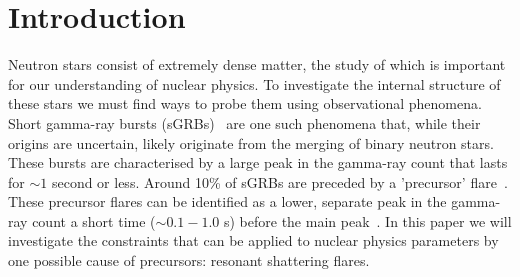 \documentclass[fleqn,usenatbib]{mnras}
\begin{document}



 


\section{Introduction}
\hspace{\parindent}Neutron stars consist of extremely dense matter, the study of which is important for our understanding of nuclear physics. To investigate the internal structure of these stars we must find ways to probe them using observational phenomena. Short gamma-ray bursts (sGRBs)~\cite{d2015short} are one such phenomena that, while their origins are uncertain, likely originate from the merging of binary neutron stars. These bursts are characterised by a large peak in the gamma-ray count that lasts for $\sim 1$ second or less. Around 10\% of sGRBs are preceded by a 'precursor' flare~\cite{troja2010precursors}. These precursor flares can be identified as a lower, separate peak in the gamma-ray count a short time ($\sim 0.1-1.0$ s) before the main peak~\cite{zhong2019precursors}. In this paper we will investigate the constraints that can be applied to nuclear physics parameters by one possible cause of precursors: resonant shattering flares.
\end{document}
